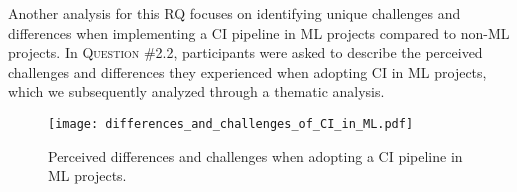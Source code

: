Another analysis for this RQ focuses on identifying unique challenges and differences when implementing a CI pipeline in ML projects compared to non-ML projects. In \textsc{Question \#2.2}, participants were asked to describe the perceived challenges and differences they experienced when adopting CI in ML projects, which we subsequently analyzed through a thematic analysis.


\begin{figure}
	\centering
	\texttt{[image: differences\_and\_challenges\_of\_CI\_in\_ML.pdf]}
	\caption{Perceived differences and challenges when adopting a CI pipeline in ML projects.}
	\label{fig:q2_2_differences_and_challenges}       %
\end{figure}

